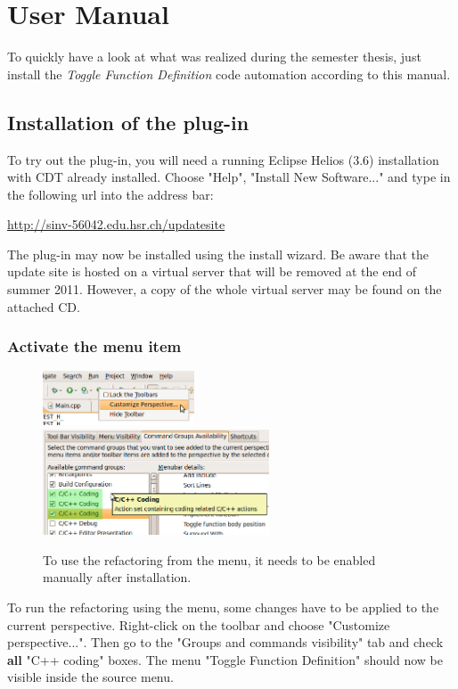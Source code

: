 \chapter{User Manual}
\thispagestyle{fancy}

To quickly have a look at what was realized during the semester thesis, just 
install the \textit{Toggle Function Definition} code automation according to 
this manual.

\section{Installation of the plug-in}

To try out the plug-in, you will need a running Eclipse Helios (3.6) installation with CDT already installed. Choose "Help", "Install New Software..." and type in the following url into the address bar:

\url{http://sinv-56042.edu.hsr.ch/updatesite}

The plug-in may now be installed using the install wizard. Be aware that the 
update site is hosted on a virtual server that will be removed at the end of 
summer 2011. However, a copy of the whole virtual server may be found on the 
attached CD.

\subsection{Activate the menu item}

\begin{figure}[h]
\includegraphics[width=0.4\textwidth]{images/customizeperspective.png}
\includegraphics[width=0.6\textwidth]{images/commandgroups.png}
\caption{To use the refactoring from the menu, it needs to be enabled manually 
after installation.}
\label{showMenu}
\end{figure}
\label{cmdGroup}
To run the refactoring using the menu, some changes have to be applied to the 
current perspective. Right-click on the toolbar and choose 
"Customize perspective...". Then go to the "Groups and commands visibility" tab 
and check \textbf{all} "C++ coding" boxes. The menu "Toggle Function Definition" 
should now be visible inside the source menu.

